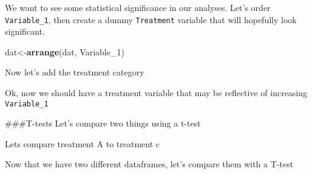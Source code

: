 \documentclass[
]{article}
\newenvironment{Shaded}{\begin{snugshade}}{\end{snugshade}}
\newcommand{\DecValTok}[1]{\textcolor[rgb]{0.00,0.00,0.81}{#1}}
\newcommand{\KeywordTok}[1]{\textcolor[rgb]{0.13,0.29,0.53}{\textbf{#1}}}
\newcommand{\NormalTok}[1]{#1}
\newcommand{\OperatorTok}[1]{\textcolor[rgb]{0.81,0.36,0.00}{\textbf{#1}}}
\newcommand{\StringTok}[1]{\textcolor[rgb]{0.31,0.60,0.02}{#1}}
\begin{document}
We want to see some statistical significance in our analyses. Let's
order \texttt{Variable\_1}, then create a dummy \texttt{Treatment}
variable that will hopefully look significant.

\begin{Shaded}
\begin{Highlighting}[]
\NormalTok{dat<-}\KeywordTok{arrange}\NormalTok{(dat, Variable_}\DecValTok{1}\NormalTok{)}
\end{Highlighting}
\end{Shaded}

Now let's add the treatment category

\begin{Shaded}
\end{Shaded}

Ok, now we should have a treatment variable that may be reflective of
increasing \texttt{Variable\_1}

\#\#\#T-tests Let's compare two things using a t-test

Lets compare treatment A to treatment c

\begin{Shaded}
\end{Shaded}

Now that we have two different dataframes, let's compare them with a
T-test

\begin{Shaded}
\end{Shaded}
\end{document}
